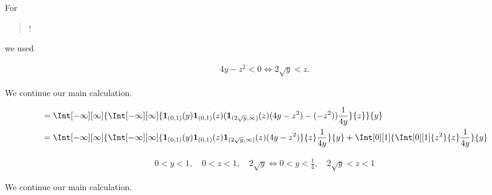 \begin{solution}
\begin{enumerate}[label = (\alph*)]
    For \blockquote{!} we used

    \begin{align*}
        4 y - z^2 < 0
        \iff
        2 \sqrt y < z.
    \end{align*}

    We continue our main calculation.

    \begin{align*}
        & =
        \Int[-\infty][\infty]
        {
            \Int[-\infty][\infty]
            {
                \mathbf 1_{(0, 1)}(y)
                \mathbf 1_{(0, 1)}(z)
                (
                    \mathbf 1_{(2 \sqrt y, \infty)}(z) (4 y - z^2)
                    -
                    (-z^2)
                )
                \frac{1}{4 y}
            }{z}
        }{y} \\
        & =
        \Int[-\infty][\infty]
        {
            \Int[-\infty][\infty]
            {
                \mathbf 1_{(0, 1)}(y)
                \mathbf 1_{(0, 1)}(z)
                \mathbf 1_{(2 \sqrt y, \infty)}(z) (4 y - z^2)
            }{z}
            \frac{1}{4 y}
        }{y}
        +
        \Int[0][1]
        {
            \Int[0][1]
            {
                z^2
            }{z}
            \frac{1}{4 y}
        }{y}
    \end{align*}

    \begin{align*}
        0 < y < 1, \quad 0 < z < 1, \quad 2 \sqrt y
        \iff
        0 < y < \frac{1}{4}, \quad 2 \sqrt y < z < 1
    \end{align*}

    We continue our main calculation.


\end{enumerate}
\end{solution}
